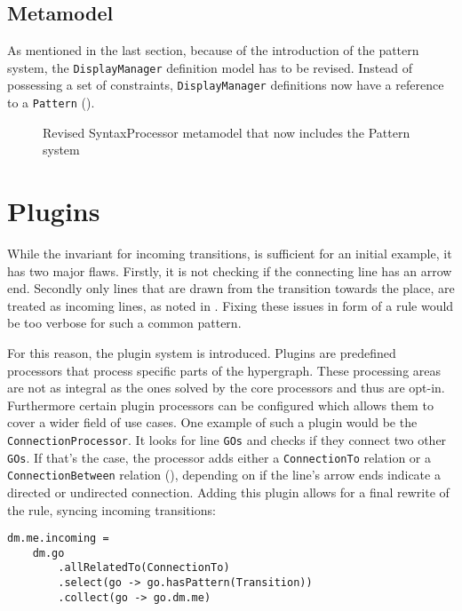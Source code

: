 \subsection{Metamodel}
As mentioned in the last section, because of the introduction of the pattern system, the \texttt{DisplayManager} definition model has to be revised. Instead of possessing a set of constraints, \texttt{DisplayManager} definitions now have a reference to a \texttt{Pattern} ().

\begin{figure}
  \centering
  
  \caption{Revised SyntaxProcessor metamodel that now includes the Pattern system}
  \label{fig:revised-syntax-model}
\end{figure}


\section{Plugins}
\label{sec:plugins}
While the invariant for incoming transitions, is sufficient for an initial example, it has two major flaws. Firstly, it is not checking if the connecting line has an arrow end. Secondly only lines that are drawn from the transition towards the place, are treated as incoming lines, as noted in . Fixing these issues in form of a rule would be too verbose for such a common pattern.

For this reason, the plugin system is introduced. Plugins are predefined processors that process specific parts of the hypergraph. These processing areas are not as integral as the ones solved by the core processors and thus are opt-in. Furthermore certain plugin processors can be configured which allows them to cover a wider field of use cases. One example of such a plugin would be the \texttt{ConnectionProcessor}. It looks for line \texttt{GOs} and checks if they connect two other \texttt{GOs}. If that's the case, the processor adds either a \texttt{ConnectionTo} relation or a \texttt{ConnectionBetween} relation (), depending on if the line's arrow ends indicate a directed or undirected connection. Adding this plugin allows for a final rewrite of the rule, syncing incoming transitions:

\begin{lstlisting}[captionpos=b,caption={Final iteration of the place incoming transition rule}]
dm.me.incoming = 
    dm.go
        .allRelatedTo(ConnectionTo)
        .select(go -> go.hasPattern(Transition))
        .collect(go -> go.dm.me)
\end{lstlisting}

